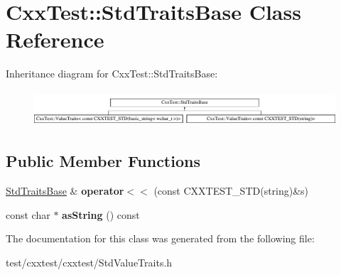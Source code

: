 \hypertarget{classCxxTest_1_1StdTraitsBase}{\section{Cxx\-Test\-:\-:Std\-Traits\-Base Class Reference}
\label{classCxxTest_1_1StdTraitsBase}
}
Inheritance diagram for Cxx\-Test\-:\-:Std\-Traits\-Base\-:\begin{figure}[H]
\begin{center}
\leavevmode
\includegraphics[height=1.330166cm]{classCxxTest_1_1StdTraitsBase}
\end{center}
\end{figure}
\subsection*{Public Member Functions}
\begin{DoxyCompactItemize}
\item 
\hypertarget{classCxxTest_1_1StdTraitsBase_a718ab1ca1874b1a3892592d66b6e7437}{\hyperlink{classCxxTest_1_1StdTraitsBase}{Std\-Traits\-Base} \& {\bfseries operator$<$$<$} (const C\-X\-X\-T\-E\-S\-T\-\_\-\-S\-T\-D(string)\&s)}\label{classCxxTest_1_1StdTraitsBase_a718ab1ca1874b1a3892592d66b6e7437}

\item 
\hypertarget{classCxxTest_1_1StdTraitsBase_a29350abcc52bf3beacaa27535f9cbb28}{const char $\ast$ {\bfseries as\-String} () const }\label{classCxxTest_1_1StdTraitsBase_a29350abcc52bf3beacaa27535f9cbb28}

\end{DoxyCompactItemize}


The documentation for this class was generated from the following file\-:\begin{DoxyCompactItemize}
\item 
test/cxxtest/cxxtest/Std\-Value\-Traits.\-h\end{DoxyCompactItemize}
